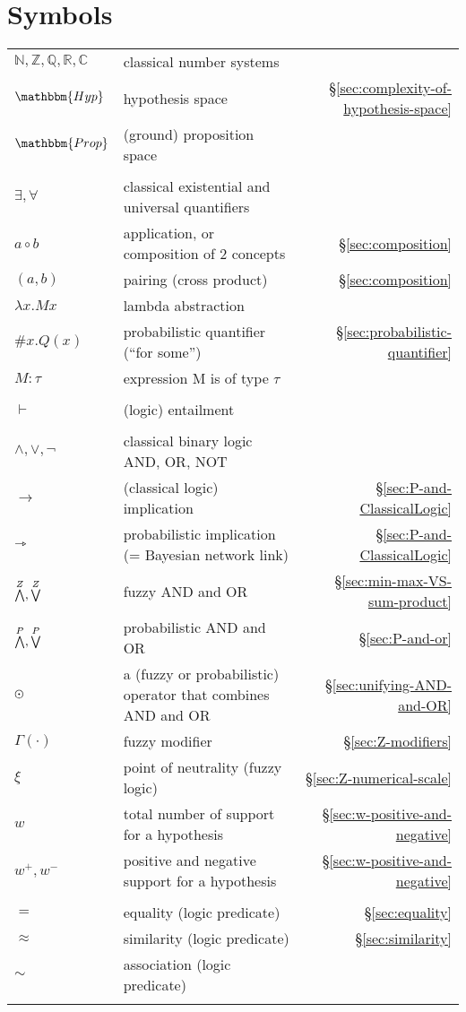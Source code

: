 \chapter*{Symbols}

\begin{tabular*}{0.9\textwidth}{llr}
$\mathbb{N,Z,Q,R,C}$ & classical number systems & \tabularnewline
$\mathbbm{Hyp}$ & hypothesis space & \S\ref{sec:complexity-of-hypothesis-space} \tabularnewline
$\mathbbm{Prop}$ & (ground) proposition space & \tabularnewline
\\

$\exists, \forall$  & classical existential and universal quantifiers & \tabularnewline
$a \circ b$ & application, or composition of 2 concepts& \S\ref{sec:composition} \tabularnewline
$(a, b)$ & pairing (cross product)& \S\ref{sec:composition} \tabularnewline
$\lambda x. M x$ & lambda abstraction & \tabularnewline
$\#x. Q(x)$ & probabilistic quantifier ({}``for some'') & \S\ref{sec:probabilistic-quantifier} \tabularnewline
$M:\tau$ & expression M is of type $\tau$ & \tabularnewline
\\

$\vdash$ & (logic) entailment & \tabularnewline
\\

$\wedge, \vee, \neg$ & classical binary logic AND, OR, NOT & \tabularnewline
$\rightarrow$ & (classical logic) implication & \S\ref{sec:P-and-ClassicalLogic} \tabularnewline
$\rightarrowtriangle$ & probabilistic implication (= Bayesian network link) & \S\ref{sec:P-and-ClassicalLogic} \tabularnewline
$\stackrel{Z}{\bigwedge}, \stackrel{Z}{\bigvee}$ & fuzzy AND and OR & \S\ref{sec:min-max-VS-sum-product} \tabularnewline
$\stackrel{P}{\bigwedge}, \stackrel{P}{\bigvee} $ & probabilistic AND and OR & \S\ref{sec:P-and-or} \tabularnewline
$\varodot$ & a (fuzzy or probabilistic) operator that combines AND and OR & \S\ref{sec:unifying-AND-and-OR} \tabularnewline
$\Gamma(\cdot)$ & fuzzy modifier & \S\ref{sec:Z-modifiers} \tabularnewline
$\xi$ & point of neutrality (fuzzy logic) & \S\ref{sec:Z-numerical-scale} \tabularnewline
$w$ & total number of support for a hypothesis & \S\ref{sec:w-positive-and-negative} \tabularnewline
$w^+, w^-$ & positive and negative support for a hypothesis & \S\ref{sec:w-positive-and-negative} \tabularnewline
\\

$=$ & equality (logic predicate) & \S\ref{sec:equality} \tabularnewline
$\approx$ & similarity (logic predicate) & \S\ref{sec:similarity} \tabularnewline
$\sim$ & association (logic predicate) & \tabularnewline
\\


\end{tabular*}
